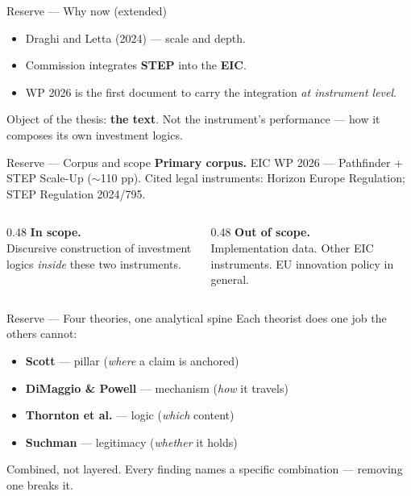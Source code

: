 \documentclass[aspectratio=169,hyperref={pdfpagelabels=false}]{beamer}
\begin{document}
\begin{frame}{Reserve — Why now (extended)}
    \begin{itemize}
        \item Draghi and Letta (2024) — scale and depth.
        \item Commission integrates \textbf{STEP} into the \textbf{EIC}.
        \item WP 2026 is the first document to carry the integration \emph{at instrument level}.
    \end{itemize}
    \vspace{3mm}
    Object of the thesis: \textbf{the text}. Not the instrument's performance — how it composes its own investment logics.
\end{frame}

\begin{frame}{Reserve — Corpus and scope}
    \textbf{Primary corpus.} EIC WP 2026 — Pathfinder + STEP Scale-Up ($\sim$110 pp). Cited legal instruments: Horizon Europe Regulation; STEP Regulation 2024/795.

    \vspace{6mm}
    \begin{columns}[T,onlytextwidth]
        \begin{column}{0.48\textwidth}
            \textbf{In scope.}\\[1mm]
            Discursive construction of investment logics \emph{inside} these two instruments.
        \end{column}
        \begin{column}{0.48\textwidth}
            \textbf{Out of scope.}\\[1mm]
            Implementation data. Other EIC instruments. EU innovation policy in general.
        \end{column}
    \end{columns}
\end{frame}

\begin{frame}{Reserve — Four theories, one analytical spine}
    Each theorist does one job the others cannot:
    \begin{itemize}
        \item \textbf{Scott} — pillar (\emph{where} a claim is anchored)
        \item \textbf{DiMaggio \& Powell} — mechanism (\emph{how} it travels)
        \item \textbf{Thornton et al.} — logic (\emph{which} content)
        \item \textbf{Suchman} — legitimacy (\emph{whether} it holds)
    \end{itemize}
    \vspace{3mm}
    Combined, not layered. Every finding names a specific combination — removing one breaks it.
\end{frame}
\end{document}
